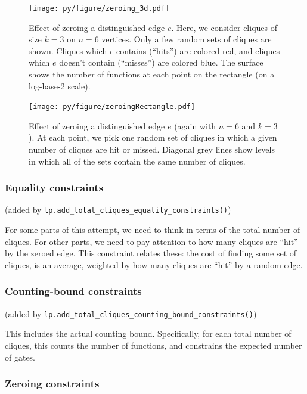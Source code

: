 \documentclass[12pt]{article}
\theoremstyle{definition}
\begin{document}
\begin{figure}
\centering
\texttt{[image: py/figure/zeroing\_3d.pdf]}
\caption{Effect of zeroing a distinguished edge $e$.
Here, we consider cliques of size $k=3$ on $n=6$ vertices.
Only a few random sets of cliques are shown.
Cliques which $e$ contains (``hits'')
are colored red, and cliques which $e$ doesn't contain (``misses'')
are colored blue.
The surface shows the number of functions at each point
on the rectangle (on a log-base-2 scale).
}
\label{fig:zeroing3D}
\end{figure}

\begin{figure}
\centering
\texttt{[image: py/figure/zeroingRectangle.pdf]}
\caption{Effect of zeroing a distinguished edge $e$
(again with $n=6$ and $k=3$).
At each point, we pick one random set of cliques in which
a given number of cliques are hit or missed.
Diagonal grey lines show levels in which all of the sets
contain the same number of cliques.
}
\label{fig:zeroingRectangle}
\end{figure}

\subsubsection{Equality constraints}

(added by {\tt lp.add\_total\_cliques\_equality\_constraints()})

For some parts of this attempt, we need to think in terms of
the total number of cliques. For other parts, we need to pay attention
to how many cliques are ``hit'' by the zeroed edge. This constraint
relates these: the cost of finding some set of cliques, is an
average, weighted by how many cliques are ``hit'' by a random edge.

\subsubsection{Counting-bound constraints}

(added by {\tt lp.add\_total\_cliques\_counting\_bound\_constraints()})

This includes the actual counting bound. Specifically, for
each total number of cliques, this counts the number of functions,
and constrains the expected number of gates.

\subsubsection{Zeroing constraints}
\end{document}
